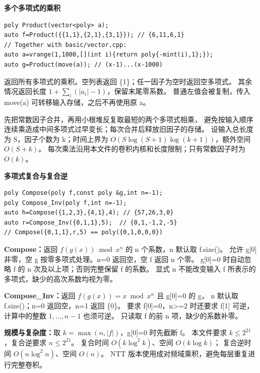 \documentclass[UTF8,a4paper,10pt]{ctexart}
\begin{document}
\noindent\begin{minipage}{\textwidth}
\textbf{多个多项式的乘积}
\begin{lstlisting}
poly Product(vector<poly> a);
auto f=Product({{1,1},{2,1},{3,1}}); // {6,11,6,1}
// Together with basic/vector.cpp:
auto a=vrange(1,1000,[](int i){return poly{-mint(i),1};});
auto g=Product(move(a)); // (x-1)...(x-1000)
\end{lstlisting}
返回所有多项式的乘积。空列表返回 \{1\}；任一因子为空时返回空多项式。
其余情况返回长度 $1+\sum_i(\lvert a_i\rvert-1)$，保留末尾零系数。
普通左值会被复制，传入 move(a) 可转移输入存储，之后不再使用原 a。

先把常数因子合并，再用小根堆反复取最短的两个多项式相乘，
避免按输入顺序连续乘造成中间多项式过早变长；每次合并后释放旧因子的存储。
设输入总长度为 S，因子个数为 k；时间上界为
$O(S\log(S+1)\log(k+1))$，额外空间 $O(S+k)$。
每次乘法沿用本文件的卷积内核和长度限制；只有常数因子时为 $O(k)$。
\end{minipage}\par\vspace{0.4em}
\noindent\begin{minipage}{\textwidth}
\textbf{多项式复合与复合逆}
\begin{lstlisting}
poly Compose(poly f,const poly &g,int n=-1);
poly Compose_Inv(poly f,int n=-1);
auto h=Compose({1,2,3},{4,1},4); // {57,26,3,0}
auto r=Compose_Inv({0,1,1},5);  // {0,1,-1,2,-5}
// Compose({0,1,1},r,5) == poly({0,1,0,0,0})
\end{lstlisting}
\textbf{Compose：}返回 $f(g(x))\bmod x^n$ 的 n 个系数，n 默认取 f.size()。
允许 g[0] 非零，空 g 按零多项式处理。n=0 返回空，空 f 返回 n 个零。
g[0]=0 时自动忽略 f 的 n 次及以上项；否则完整保留 f 的系数。
显式 n 不能改变输入 f 所表示的多项式，缺少的高次系数均视为零。

\textbf{Compose\_Inv：}返回 $f(g(x))=x\bmod x^n$ 且 g[0]=0 的 g，
n 默认取 f.size()；n=0 返回空，n=1 返回 \{0\}。
要求 f[0]=0，n>=2 时还要求 f[1] 可逆，计算中的整数 $1,\ldots,n-1$ 也须可逆。
只读取 f 的前 n 项，缺少的系数补零。

\textbf{规模与复杂度：}取 $k=\max(n,\lvert f\rvert)$，g[0]=0 时先截断 f。
本文件要求 $k\le 2^{21}$，复合逆要求 $n\le 2^{21}$。
复合时间 $O(k\log^2 k)$、空间 $O(k\log k)$；
复合逆时间 $O(n\log^2 n)$、空间 $O(n)$。
NTT 版本使用成对频域乘积，避免每层重复进行完整卷积。
\end{minipage}\par\vspace{0.4em}
\end{document}
